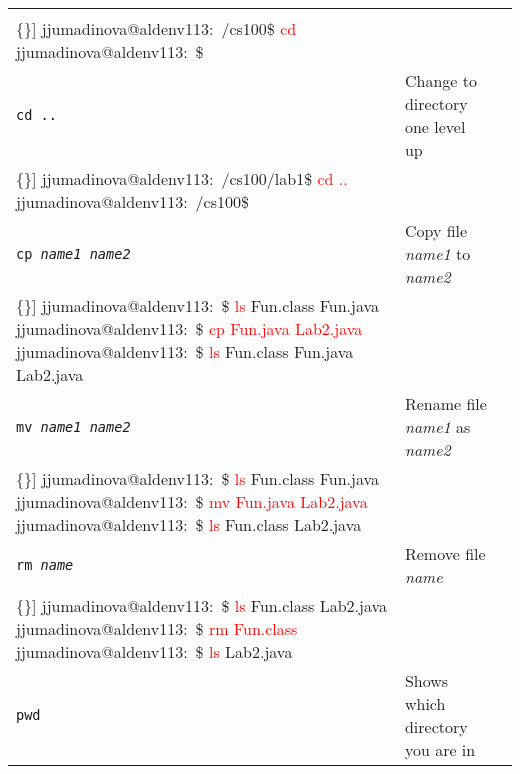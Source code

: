 \begin{table}[htbp]
\begin{tabular}{l|p{1.5in}|p{2.5in}}
\begin{minipage}{2.5in}
\begin{Verbatim}[commandchars=\\\{\}]
jjumadinova@aldenv113:~/cs100\$ \textcolor{red}{cd}
jjumadinova@aldenv113:~\$
\end{Verbatim}
\end{minipage}\\\hline
\rule{0em}{2.5em}\tt cd \verb$..$& Change to directory one level up&
\begin{minipage}{2.5in}
\begin{Verbatim}[commandchars=\\\{\}]
jjumadinova@aldenv113:~/cs100/lab1\$ \textcolor{red}{cd ..}
jjumadinova@aldenv113:~/cs100\$
\end{Verbatim}
\end{minipage}\\\hline
\rule{0em}{4.5em}\tt cp {\rm \em name1 name2} & Copy file {\em name1} to {\em name2}&
\begin{minipage}{2.5in}
\begin{Verbatim}[commandchars=\\\{\}]
jjumadinova@aldenv113:~\$ \textcolor{red}{ls}
Fun.class Fun.java
jjumadinova@aldenv113:~\$ \textcolor{red}{cp Fun.java Lab2.java}
jjumadinova@aldenv113:~\$ \textcolor{red}{ls}
Fun.class Fun.java Lab2.java
\end{Verbatim}
\end{minipage}\\\hline
\rule{0em}{4.5em}\tt mv {\rm \em name1 name2} & Rename file {\em name1} as {\em name2}&
\begin{minipage}{2.5in}
\begin{Verbatim}[commandchars=\\\{\}]
jjumadinova@aldenv113:~\$ \textcolor{red}{ls}
Fun.class Fun.java
jjumadinova@aldenv113:~\$ \textcolor{red}{mv Fun.java Lab2.java}
jjumadinova@aldenv113:~\$ \textcolor{red}{ls}
Fun.class Lab2.java
\end{Verbatim}
\end{minipage}\\\hline
\rule{0em}{4.5em}\tt rm {\rm \em name} & Remove file {\em name}&
\begin{minipage}{2.5in}
\begin{Verbatim}[commandchars=\\\{\}]
jjumadinova@aldenv113:~\$ \textcolor{red}{ls}
Fun.class Lab2.java
jjumadinova@aldenv113:~\$ \textcolor{red}{rm Fun.class}
jjumadinova@aldenv113:~\$ \textcolor{red}{ls}
Lab2.java
\end{Verbatim}
\end{minipage}\\
\hline
\rule{0em}{3.5em}\tt pwd & Shows which directory you are in &

\end{tabular}
\end{table}
